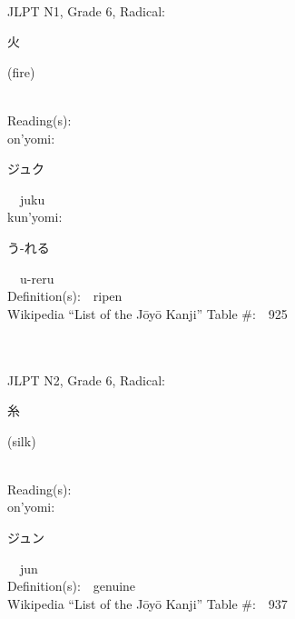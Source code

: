 \begin{multicols}{2}
{\fontsize{34pt}{40pt}  }\ \ \\  %
{JLPT N1, Grade 6, Radical:\ \ {\begin{CJK}{UTF8}{min} 火 \end{CJK}} (fire) } \\
Reading(s):\ \ \\
{\hspace*{1em}}on'yomi:\ \ \\
{\hspace*{2em}}{\begin{CJK}{UTF8}{min} ジュク \end{CJK}}\ \ juku\ \ \\
{\hspace*{1em}}kun'yomi:\ \ \\
{\hspace*{2em}}{\begin{CJK}{UTF8}{min} う-れる \end{CJK}}\ \ u-reru\ \ \\
Definition(s):\ \ ripen \\
Wikipedia ``List of the J\=oy\=o Kanji'' Table \#:\ \ 925 \\
\ \ \\
{\fontsize{34pt}{40pt}  }\ \ \\  %
{JLPT N2, Grade 6, Radical:\ \ {\begin{CJK}{UTF8}{min} 糸 \end{CJK}} (silk) } \\
Reading(s):\ \ \\
{\hspace*{1em}}on'yomi:\ \ \\
{\hspace*{2em}}{\begin{CJK}{UTF8}{min} ジュン \end{CJK}}\ \ jun\ \ \\
Definition(s):\ \ genuine \\
Wikipedia ``List of the J\=oy\=o Kanji'' Table \#:\ \ 937 \\
\ \ \\
{\fontsize{34pt}{40pt}  }\ \ \\  %

\end{multicols}
